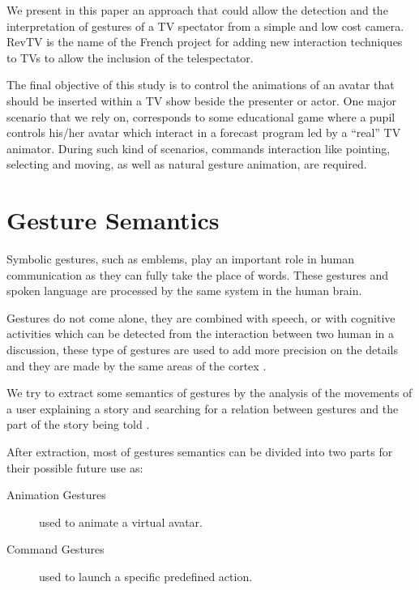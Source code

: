 \documentclass{llncs}
\begin{document}
We present in this paper an approach that could allow the detection and the
interpretation of gestures of a TV spectator from a simple and low cost camera. 
RevTV is the name of the French project for adding new interaction techniques
to TVs to allow the inclusion of the telespectator.

The final objective of this study is to control the animations of an avatar
that should be inserted within a TV show beside the presenter or actor.
One major scenario that we rely on, corresponds to some educational game where a pupil
controls his/her avatar which interact in a forecast program led by a ``real'' TV animator.
During such kind of scenarios, commands interaction
like pointing, selecting and moving, as well as natural gesture animation, are required.


\section{Gesture Semantics}
Symbolic gestures, such as emblems, play an important role in human
communication as they can fully take the place of words.
These gestures and spoken language are processed by the same system in the human brain.

Gestures do not come alone, they are combined with speech, or with cognitive
activities which can be detected from the interaction between two human in a
discussion, these type of gestures are used to add more precision on the details
and they are made by the same areas of the cortex \cite{SymbolicGest}.


We try to extract some semantics of gestures by the analysis of the movements of
a user explaining a story and searching for a relation between gestures and the
part of the story being told \cite{gestureThought}.

After extraction, most of gestures semantics can be divided into two parts for
their possible future use as:
\begin{description}
 \item[Animation Gestures] used to animate a virtual avatar.
 \item[Command Gestures] used to launch a specific predefined action.
\end{description}
\end{document}
